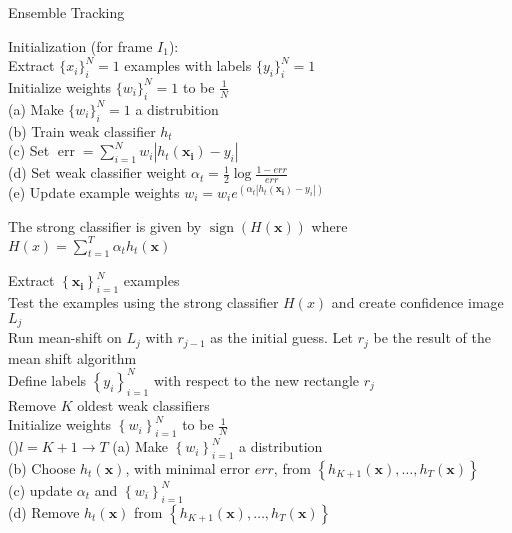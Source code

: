  \begin{algorithm}
        \caption{Ensemble Tracking}
         \label{ensemble}
        \LinesNumbered
        
        Initialization (for frame $I_1$):\\
        Extract $\{x_i\}^N_i=1$ examples with labels $\{y_i\}^N_i=1$\\
        Initialize weights $\{w_i\}^N_i=1$ to be $\frac{1}{N}$\\
        {
        (a) Make $\{w_i\}^N_i=1$ a distrubition\\
        (b) Train weak classifier $h_t$\\
        (c) Set $\operatorname{err}=\sum_{i=1}^N w_i\left|h_t\left(\mathbf{x}_{\mathbf{i}}\right)-y_i\right|$\\
        (d) Set weak classifier weight $\alpha_t=\frac{1}{2} \log \frac{1-e r r}{e r r}$\\
        (e) Update example weights $w_i=w_i e^{\left(\alpha_t\left|h_t\left(\mathbf{x}_{\mathbf{i}}\right)-y_i\right|\right)}$\\
        }
        
        The strong classifier is given by $\operatorname{sign}(H(\mathbf{x}))$ where $H(x)=\sum_{t=1}^T \alpha_t h_t(\mathbf{x})$\\
        
         {
         Extract $\left\{\mathbf{x}_{\mathbf{i}}\right\}_{i=1}^N$ examples\\
         Test the examples using the strong classifier $H(x)$ and create confidence image $L_j$\\
         Run mean-shift on $L_j$ with $r_{j-1}$ as the initial guess. Let $r_j$ be the result of the mean shift algorithm\\
         Define labels $\left\{y_i\right\}_{i=1}^N$ with respect to the new rectangle $r_j$\\
         Remove $K$ oldest weak classifiers\\
         Initialize weights $\left\{w_i\right\}_{i=1}^N$ to be $\frac{1}{N}$\\
         \For(){$l=K+1 \to T$}
         {
         (a) Make $\left\{w_i\right\}_{i=1}^N$ a distribution\\
         (b) Choose $h_t(\mathbf{x})$, with minimal error $e r r$, from $\left\{h_{K+1}(\mathbf{x}), \ldots, h_T(\mathbf{x})\right\}$\\
         (c) update $\alpha_t$ and $\left\{w_i\right\}_{i=1}^N$\\
         (d) Remove $h_t(\mathbf{x})$ from $\left\{h_{K+1}(\mathbf{x}), \ldots, h_T(\mathbf{x})\right\}$\\
         }
         
}
\end{algorithm}
